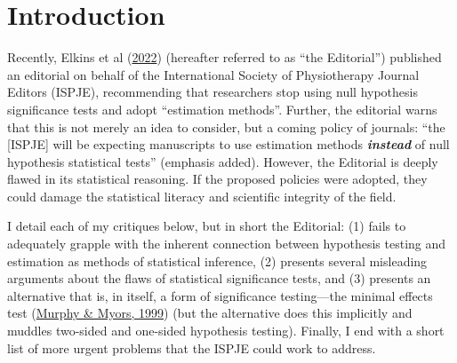 \documentclass[]{cik}%
\begin{document}
\providecommand{\tightlist}{%
  \setlength{\itemsep}{0pt}\setlength{\parskip}{0pt}}
\providecommand{\EndFirstPage}{%
}


\maketitle

\newpage

\hypertarget{introduction}{%
\section{Introduction}\label{introduction}}

Recently, Elkins et al (\protect\hyperlink{ref-1}{2022}) (hereafter
referred to as ``the Editorial'') published an editorial on behalf of
the International Society of Physiotherapy Journal Editors (ISPJE),
recommending that researchers stop using null hypothesis significance
tests and adopt ``estimation methods''. Further, the editorial warns
that this is not merely an idea to consider, but a coming policy of
journals: ``the {[}ISPJE{]} will be expecting manuscripts to use
estimation methods \textbf{\emph{instead}} of null hypothesis
statistical tests'' (emphasis added). However, the Editorial is deeply
flawed in its statistical reasoning. If the proposed policies were
adopted, they could damage the statistical literacy and scientific
integrity of the field.

I detail each of my critiques below, but in short the Editorial: (1)
fails to adequately grapple with the inherent connection between
hypothesis testing and estimation as methods of statistical inference,
(2) presents several misleading arguments about the flaws of statistical
significance tests, and (3) presents an alternative that is, in itself,
a form of significance testing---the minimal effects test
(\protect\hyperlink{ref-2}{Murphy \& Myors, 1999}) (but the alternative
does this implicitly and muddles two-sided and one-sided hypothesis
testing). Finally, I end with a short list of more urgent problems that
the ISPJE could work to address.
\end{document}
